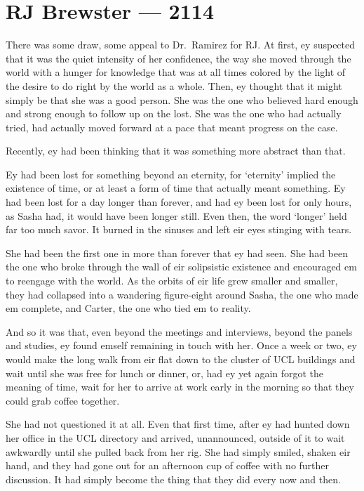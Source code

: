 \hypertarget{rj-brewster-2114}{%
\chapter{RJ Brewster — 2114}\label{rj-brewster-2114}}

There was some draw, some appeal to Dr.~Ramirez for RJ. At first, ey suspected that it was the quiet intensity of her confidence, the way she moved through the world with a hunger for knowledge that was at all times colored by the light of the desire to do right by the world as a whole. Then, ey thought that it might simply be that she was a good person. She was the one who believed hard enough and strong enough to follow up on the lost. She was the one who had actually tried, had actually moved forward at a pace that meant progress on the case.

Recently, ey had been thinking that it was something more abstract than that.

Ey had been lost for something beyond an eternity, for `eternity' implied the existence of time, or at least a form of time that actually meant something. Ey had been lost for a day longer than forever, and had ey been lost for only hours, as Sasha had, it would have been longer still. Even then, the word `longer' held far too much savor. It burned in the sinuses and left eir eyes stinging with tears.

She had been the first one in more than forever that ey had seen. She had been the one who broke through the wall of eir solipsistic existence and encouraged em to reengage with the world. As the orbits of eir life grew smaller and smaller, they had collapsed into a wandering figure-eight around Sasha, the one who made em complete, and Carter, the one who tied em to reality.

And so it was that, even beyond the meetings and interviews, beyond the panels and studies, ey found emself remaining in touch with her. Once a week or two, ey would make the long walk from eir flat down to the cluster of UCL buildings and wait until she was free for lunch or dinner, or, had ey yet again forgot the meaning of time, wait for her to arrive at work early in the morning so that they could grab coffee together.

She had not questioned it at all. Even that first time, after ey had hunted down her office in the UCL directory and arrived, unannounced, outside of it to wait awkwardly until she pulled back from her rig. She had simply smiled, shaken eir hand, and they had gone out for an afternoon cup of coffee with no further discussion. It had simply become the thing that they did every now and then.

